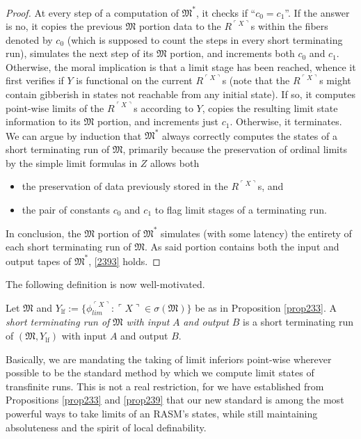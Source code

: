 \documentclass[12pt]{article}
\numberwithin{equation}{section}
\begin{document}
\begin{proof}
At every step of a computation of $\mathfrak{M}^*$, it checks if ``$c_0 = c_1$''. If the answer is no, it copies the previous $\mathfrak{M}$ portion data to the $R^{\ulcorner X \urcorner}$s within the fibers denoted by $c_0$ (which is supposed to count the steps in every short terminating run), simulates the next step of its $\mathfrak{M}$ portion, and increments both $c_0$ and $c_1$. Otherwise, the moral implication is that a limit stage has been reached, whence it first verifies if $Y$ is functional on the current $R^{\ulcorner X \urcorner}$s (note that the $R^{\ulcorner X \urcorner}$s might contain gibberish in states not reachable from any initial state). If so, it computes point-wise limits of the $R^{\ulcorner X \urcorner}$s according to $Y$, copies the resulting limit state information to its $\mathfrak{M}$ portion, and increments just $c_1$. Otherwise, it terminates. We can argue by induction that $\mathfrak{M}^*$ always correctly computes the states of a short terminating run of $\mathfrak{M}$, primarily because the preservation of ordinal limits by the simple limit formulas in $Z$ allows both
\begin{itemize}
    \item the preservation of data previously stored in the $R^{\ulcorner X \urcorner}$s, and
    \item the pair of constants $c_0$ and $c_1$ to flag limit stages of a terminating run.
\end{itemize} 

In conclusion, the $\mathfrak{M}$ portion of $\mathfrak{M}^*$ simulates (with some latency) the entirety of each short terminating run of $\mathfrak{M}$. As said portion contains both the input and output tapes of $\mathfrak{M}^*$, \ref{2393} holds.
\end{proof}

The following definition is now well-motivated.

\begin{defi}
Let $\mathfrak{M}$ and $Y_{\mathrm{lf}} := \{\phi_{lim}^{\ulcorner X \urcorner} : \ulcorner X \urcorner \in \sigma(\mathfrak{M})\}$ be as in Proposition \ref{prop233}. A \emph{short terminating run of} $\mathfrak{M}$ \emph{with input} $A$ \emph{and output} $B$ is a short terminating run of $(\mathfrak{M}, Y_{\mathrm{lf}})$ with input $A$ and output $B$.
\end{defi}

Basically, we are mandating the taking of limit inferiors point-wise wherever possible to be the standard method by which we compute limit states of transfinite runs. This is not a real restriction, for we have established from Propositions \ref{prop233} and \ref{prop239} that our new standard is among the most powerful ways to take limits of an RASM's states, while still maintaining absoluteness and the spirit of local definability.
\end{document}
